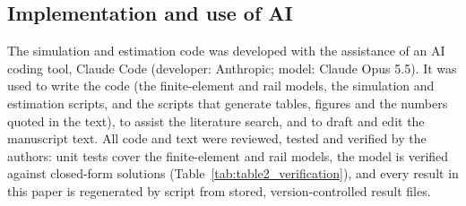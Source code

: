 \subsection{Implementation and use of AI}\label{sec:implementation}
The simulation and estimation code was developed with the assistance of an AI coding tool, Claude Code
(developer: Anthropic; model: Claude Opus 5.5). It was used to write the code (the finite-element and
rail models, the simulation and estimation scripts, and the scripts that generate tables, figures and
the numbers quoted in the text), to assist the literature search, and to draft and edit the manuscript
text. All code and text were reviewed, tested and
verified by the authors: unit tests cover the finite-element and rail models, the model is verified
against closed-form solutions (Table~\ref{tab:table2_verification}), and every result in this paper is
regenerated by script from stored, version-controlled result files.
